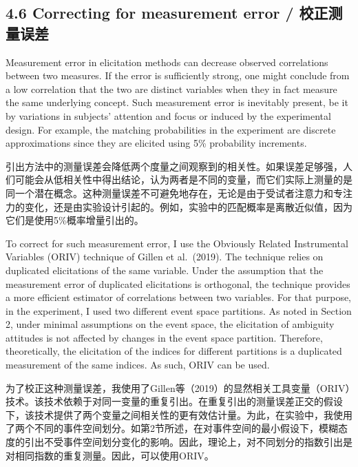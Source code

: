 \documentclass[12pt,a4paper]{article}
\newenvironment{original}
  {\par\medskip\noindent\color{black}\ignorespaces}
  {\par\medskip}
\newenvironment{translation}
  {\par\noindent\color{transblue}\ignorespaces}
  {\par\medskip\medskip}
\begin{document}
\subsection{4.6 Correcting for measurement error / 校正测量误差}

\begin{original}
Measurement error in elicitation methods can decrease observed correlations between two measures. If the error is sufficiently strong, one might conclude from a low correlation that the two are distinct variables when they in fact measure the same underlying concept. Such measurement error is inevitably present, be it by variations in subjects' attention and focus or induced by the experimental design. For example, the matching probabilities in the experiment are discrete approximations since they are elicited using 5\% probability increments.
\end{original}

\begin{translation}
引出方法中的测量误差会降低两个度量之间观察到的相关性。如果误差足够强，人们可能会从低相关性中得出结论，认为两者是不同的变量，而它们实际上测量的是同一个潜在概念。这种测量误差不可避免地存在，无论是由于受试者注意力和专注力的变化，还是由实验设计引起的。例如，实验中的匹配概率是离散近似值，因为它们是使用5\%概率增量引出的。
\end{translation}

\begin{original}
To correct for such measurement error, I use the Obviously Related Instrumental Variables (ORIV) technique of Gillen et al.\ (2019). The technique relies on duplicated elicitations of the same variable. Under the assumption that the measurement error of duplicated elicitations is orthogonal, the technique provides a more efficient estimator of correlations between two variables. For that purpose, in the experiment, I used two different event space partitions. As noted in Section 2, under minimal assumptions on the event space, the elicitation of ambiguity attitudes is not affected by changes in the event space partition. Therefore, theoretically, the elicitation of the indices for different partitions is a duplicated measurement of the same indices. As such, ORIV can be used.
\end{original}

\begin{translation}
为了校正这种测量误差，我使用了Gillen等（2019）的显然相关工具变量（ORIV）技术。该技术依赖于对同一变量的重复引出。在重复引出的测量误差正交的假设下，该技术提供了两个变量之间相关性的更有效估计量。为此，在实验中，我使用了两个不同的事件空间划分。如第2节所述，在对事件空间的最小假设下，模糊态度的引出不受事件空间划分变化的影响。因此，理论上，对不同划分的指数引出是对相同指数的重复测量。因此，可以使用ORIV。
\end{translation}
\end{document}
